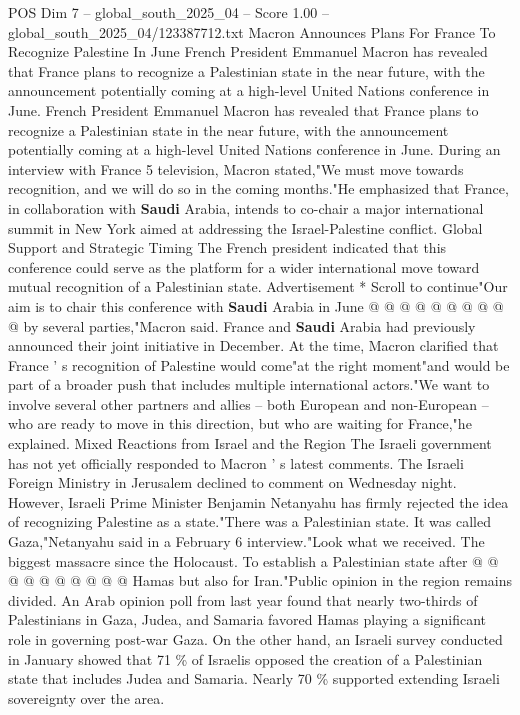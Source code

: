 \begin{textsample}{POS Dim 7 – global\_south\_2025\_04 – Score 1.00 – global\_south\_2025\_04/123387712.txt}  \label{ex:f7_pos_147}
Macron Announces Plans For France To Recognize Palestine In June French President Emmanuel Macron has revealed that France plans to recognize a Palestinian state in the near future, with the announcement potentially coming at a high-level United Nations conference in June.
French President Emmanuel Macron has revealed that France plans to recognize a Palestinian state in the near future, with the announcement potentially coming at a high-level United Nations conference in June.
During an interview with France 5 television, Macron stated,"We must move towards recognition, and we will do so in the coming months."He emphasized that France, in collaboration with \textbf{Saudi} Arabia, intends to co-chair a major international summit in New York aimed at addressing the Israel-Palestine conflict.
Global Support and Strategic Timing The French president indicated that this conference could serve as the platform for a wider international move toward mutual recognition of a Palestinian state.
Advertisement * Scroll to continue"Our aim is to chair this conference with \textbf{Saudi} Arabia in June @ @ @ @ @ @ @ @ @ @ by several parties,"Macron said.
France and \textbf{Saudi} Arabia had previously announced their joint initiative in December.
At the time, Macron clarified that France ' s recognition of Palestine would come"at the right moment"and would be part of a broader push that includes multiple international actors."We want to involve several other partners and allies -- both European and non-European -- who are ready to move in this direction, but who are waiting for France,"he explained.
Mixed Reactions from Israel and the Region The Israeli government has not yet officially responded to Macron ' s latest comments.
The Israeli Foreign Ministry in Jerusalem declined to comment on Wednesday night.
However, Israeli Prime Minister Benjamin Netanyahu has firmly rejected the idea of recognizing Palestine as a state."There was a Palestinian state.
It was called Gaza,"Netanyahu said in a February 6 interview."Look what we received.
The biggest massacre since the Holocaust.
To establish a Palestinian state after @ @ @ @ @ @ @ @ @ @ Hamas but also for Iran."Public opinion in the region remains divided.
An Arab opinion poll from last year found that nearly two-thirds of Palestinians in Gaza, Judea, and Samaria favored Hamas playing a significant role in governing post-war Gaza.
On the other hand, an Israeli survey conducted in January showed that 71 \% of Israelis opposed the creation of a Palestinian state that includes Judea and Samaria.
Nearly 70 \% supported extending Israeli sovereignty over the area.

\end{textsample}
